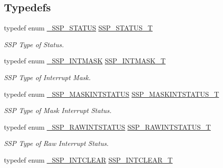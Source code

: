 \subsection*{Typedefs}
\begin{DoxyCompactItemize}
\item 
typedef enum \hyperlink{group__SSP__17XX__40XX_ga4ec33a0121a2ccab848c7b37907d9e9d}{\-\_\-\-S\-S\-P\-\_\-\-S\-T\-A\-T\-U\-S} \hyperlink{group__SSP__17XX__40XX_gad95eaf4325a2ec8e457b309d21d6987d}{S\-S\-P\-\_\-\-S\-T\-A\-T\-U\-S\-\_\-\-T}
\begin{DoxyCompactList}\small\item\em S\-S\-P Type of Status. \end{DoxyCompactList}\item 
typedef enum \hyperlink{group__SSP__17XX__40XX_gab6a0ac593093184dd21c95f53b30f4ef}{\-\_\-\-S\-S\-P\-\_\-\-I\-N\-T\-M\-A\-S\-K} \hyperlink{group__SSP__17XX__40XX_ga84198f10a9a371b8523c09a850399bf4}{S\-S\-P\-\_\-\-I\-N\-T\-M\-A\-S\-K\-\_\-\-T}
\begin{DoxyCompactList}\small\item\em S\-S\-P Type of Interrupt Mask. \end{DoxyCompactList}\item 
typedef enum \hyperlink{group__SSP__17XX__40XX_gafaff4574b830e5b94dcaf7ca8da399e8}{\-\_\-\-S\-S\-P\-\_\-\-M\-A\-S\-K\-I\-N\-T\-S\-T\-A\-T\-U\-S} \hyperlink{group__SSP__17XX__40XX_gac0b1a846ede1f57c5fa27d4163acdbe9}{S\-S\-P\-\_\-\-M\-A\-S\-K\-I\-N\-T\-S\-T\-A\-T\-U\-S\-\_\-\-T}
\begin{DoxyCompactList}\small\item\em S\-S\-P Type of Mask Interrupt Status. \end{DoxyCompactList}\item 
typedef enum \hyperlink{group__SSP__17XX__40XX_ga2042535e55396776c81a7235ed95db35}{\-\_\-\-S\-S\-P\-\_\-\-R\-A\-W\-I\-N\-T\-S\-T\-A\-T\-U\-S} \hyperlink{group__SSP__17XX__40XX_gaf901cb9befcf9302650fed7f1ddba443}{S\-S\-P\-\_\-\-R\-A\-W\-I\-N\-T\-S\-T\-A\-T\-U\-S\-\_\-\-T}
\begin{DoxyCompactList}\small\item\em S\-S\-P Type of Raw Interrupt Status. \end{DoxyCompactList}\item 
typedef enum \hyperlink{group__SSP__17XX__40XX_ga59cc14c5381f32c16286c45bd6a3ece0}{\-\_\-\-S\-S\-P\-\_\-\-I\-N\-T\-C\-L\-E\-A\-R} \hyperlink{group__SSP__17XX__40XX_gadc98b69a8cb7a5afef8dd81bebbfc66d}{S\-S\-P\-\_\-\-I\-N\-T\-C\-L\-E\-A\-R\-\_\-\-T}

\end{DoxyCompactItemize}
